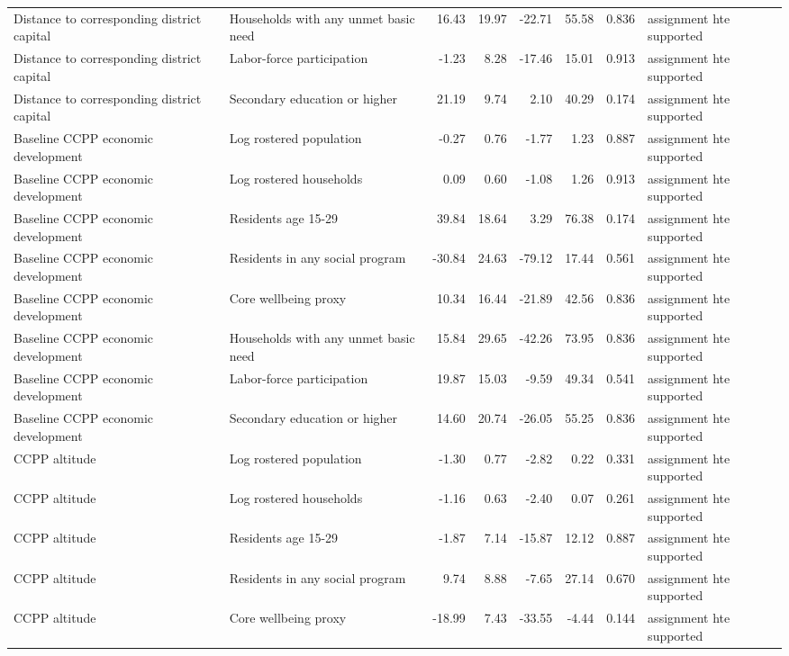 \begin{table}[!htbp]
{\begin{tabular}{llrrrrrl}
Distance to corresponding district capital & Households with any unmet basic need & 16.43 & 19.97 & -22.71 & 55.58 & 0.836 & assignment hte supported \\
Distance to corresponding district capital & Labor-force participation & -1.23 & 8.28 & -17.46 & 15.01 & 0.913 & assignment hte supported \\
Distance to corresponding district capital & Secondary education or higher & 21.19 & 9.74 & 2.10 & 40.29 & 0.174 & assignment hte supported \\
Baseline CCPP economic development & Log rostered population & -0.27 & 0.76 & -1.77 & 1.23 & 0.887 & assignment hte supported \\
Baseline CCPP economic development & Log rostered households & 0.09 & 0.60 & -1.08 & 1.26 & 0.913 & assignment hte supported \\
Baseline CCPP economic development & Residents age 15-29 & 39.84 & 18.64 & 3.29 & 76.38 & 0.174 & assignment hte supported \\
Baseline CCPP economic development & Residents in any social program & -30.84 & 24.63 & -79.12 & 17.44 & 0.561 & assignment hte supported \\
Baseline CCPP economic development & Core wellbeing proxy & 10.34 & 16.44 & -21.89 & 42.56 & 0.836 & assignment hte supported \\
Baseline CCPP economic development & Households with any unmet basic need & 15.84 & 29.65 & -42.26 & 73.95 & 0.836 & assignment hte supported \\
Baseline CCPP economic development & Labor-force participation & 19.87 & 15.03 & -9.59 & 49.34 & 0.541 & assignment hte supported \\
Baseline CCPP economic development & Secondary education or higher & 14.60 & 20.74 & -26.05 & 55.25 & 0.836 & assignment hte supported \\
CCPP altitude & Log rostered population & -1.30 & 0.77 & -2.82 & 0.22 & 0.331 & assignment hte supported \\
CCPP altitude & Log rostered households & -1.16 & 0.63 & -2.40 & 0.07 & 0.261 & assignment hte supported \\
CCPP altitude & Residents age 15-29 & -1.87 & 7.14 & -15.87 & 12.12 & 0.887 & assignment hte supported \\
CCPP altitude & Residents in any social program & 9.74 & 8.88 & -7.65 & 27.14 & 0.670 & assignment hte supported \\
CCPP altitude & Core wellbeing proxy & -18.99 & 7.43 & -33.55 & -4.44 & 0.144 & assignment hte supported \\

\end{tabular}}
\end{table}
